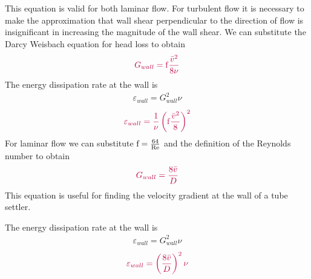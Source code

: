 \documentclass[letterpaper,10pt,english]{sphinxmanual}
\begin{document}
This equation is valid for both laminar flow. For turbulent flow it is necessary to make the approximation that wall shear perpendicular to the direction of flow is insignificant in increasing the magnitude of the wall shear. We can substitute the Darcy Weisbach equation for head loss to obtain
\begin{equation}\label{equation:Rapid_Mix/RM_Derivations:Rapid_Mix/RM_Derivations:80}
\begin{split}\color{purple}{
  G_{wall} ={\rm f}  \frac{\bar v^2}{8\nu}
}\end{split}
\end{equation}
The energy dissipation rate at the wall is
\begin{equation}\label{equation:Rapid_Mix/RM_Derivations:Rapid_Mix/RM_Derivations:81}
\begin{split}\varepsilon_{wall} = G_{wall}^2 \nu\end{split}
\end{equation}\begin{equation}\label{equation:Rapid_Mix/RM_Derivations:Rapid_Mix/RM_Derivations:82}
\begin{split}\color{purple}{
  \varepsilon_{wall} = \frac{1}{\nu}\left({\rm f}  \frac{\bar v^2}{8} \right)^2
  }\end{split}
\end{equation}
For laminar flow we can substitute \({\rm f} = \frac{64}{{\rm Re}}\) and the definition of the Reynolds number to obtain
\begin{equation}\label{equation:Rapid_Mix/RM_Derivations:Rapid_Mix/RM_Derivations:83}
\begin{split}\color{purple}{
  G_{wall} =  \frac{8\bar v}{D}
}\end{split}
\end{equation}
This equation is useful for finding the velocity gradient at the wall of a tube settler.

The energy dissipation rate at the wall is
\begin{equation}\label{equation:Rapid_Mix/RM_Derivations:Rapid_Mix/RM_Derivations:84}
\begin{split}\varepsilon_{wall} = G_{wall}^2 \nu\end{split}
\end{equation}\begin{equation}\label{equation:Rapid_Mix/RM_Derivations:Rapid_Mix/RM_Derivations:85}
\begin{split}\color{purple}{
  \varepsilon_{wall} = \left(\frac{8\bar v}{D} \right)^2 \nu
  }\end{split}
\end{equation}
\end{document}
